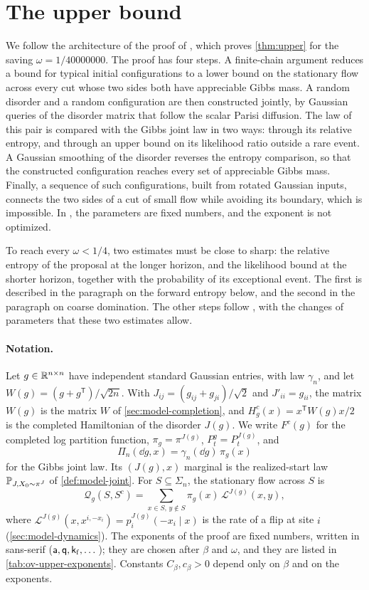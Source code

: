 \section{The upper bound}\label{sec:ov-upper}

We follow the architecture of the proof of
\cite[Theorem~1]{oai-typical-upper}, which proves \cref{thm:upper} for the
saving $\omega=1/40000000$. The proof has four steps. A finite-chain argument
reduces a bound for typical initial configurations to a lower bound on the
stationary flow across every cut whose two sides both have appreciable Gibbs
mass. A random disorder and a random configuration are then constructed
jointly, by Gaussian queries of the disorder matrix that follow the scalar
Parisi diffusion. The law of this pair is compared with the Gibbs joint law in
two ways: through its relative entropy, and through an upper bound on its
likelihood ratio outside a rare event. A Gaussian smoothing of the disorder
reverses the entropy comparison, so that the constructed configuration reaches
every set of appreciable Gibbs mass. Finally, a sequence of such
configurations, built from rotated Gaussian inputs, connects the two sides of
a cut of small flow while avoiding its boundary, which is impossible. In
\cite{oai-typical-upper}, the parameters are fixed numbers, and the exponent
is not optimized.

To reach every $\omega<1/4$, two estimates must be close to sharp: the
relative entropy of the proposal at the longer horizon, and the likelihood
bound at the shorter horizon, together with the probability of its
exceptional event. The first is described in the paragraph on the forward
entropy below, and the second in the paragraph on coarse domination. The other
steps follow \cite{oai-typical-upper}, with the changes of parameters that
these two estimates allow.

\paragraph{Notation.} Let $g\in\mathbb R^{n\times n}$ have independent standard
Gaussian entries, with law $\gamma_n$, and let
$W(g)=(g+g^{\mathsf T})/\sqrt{2n}$. With $J_{ij}=(g_{ij}+g_{ji})/\sqrt2$ and
$J'_{ii}=g_{ii}$, the matrix $W(g)$ is the matrix $W$ of
\cref{sec:model-completion}, and $H^c_g(x)=x^{\mathsf T}W(g)x/2$ is the
completed Hamiltonian of the disorder $J(g)$. We write $F^c(g)$ for the
completed log partition function, $\pi_g=\pi^{J(g)}$, $P^g_t=P^{J(g)}_t$, and
\[
 \Pi_n(\dd g,x)=\gamma_n(\dd g)\,\pi_g(x)
\]
for the Gibbs joint law. Its $(J(g),x)$ marginal is the realized-start law
$\mathbb P_{J,X_0\sim\pi^J}$ of \cref{def:model-joint}. For $S\subseteq\Sigma_n$,
the stationary flow across $S$ is
\[
 \mathcal Q_g(S,S^c)=\sum_{x\in S,\,y\notin S}\pi_g(x)\,\mathcal L^{J(g)}(x,y),
\]
where $\mathcal L^{J(g)}(x,x^{i,-x_i})=p_i^{J(g)}(-x_i\mid x)$ is the rate of
a flip at site $i$ (\cref{sec:model-dynamics}). The exponents of the proof
are fixed numbers, written in sans-serif ($\mathsf{a},\mathsf{q},\mathsf{k}_{\rm f},\dots$);
they are chosen after $\beta$ and $\omega$, and they are listed in
\cref{tab:ov-upper-exponents}. Constants $C_\beta,c_\beta>0$ depend only on
$\beta$ and on the exponents.

